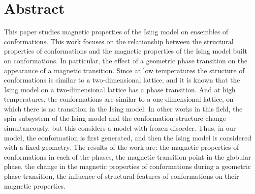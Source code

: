 \section*{Abstract}


This paper studies magnetic properties of the Ising model on ensembles of conformations.
This work focuses on the relationship between the structural properties of conformations and the magnetic properties of the Ising model built on conformations. In particular, the effect of a geometric phase transition on the appearance of a magnetic transition. Since at low temperatures the structure of conformations is similar to a two-dimensional lattice, and it is known that the Ising model on a two-dimensional lattice has a phase transition. And at high temperatures, the conformations are similar to a one-dimensional lattice, on which there is no transition in the Ising model.
In other works in this field, the spin subsystem of the Ising model and the conformation structure change simultaneously, but this considers a model with frozen disorder. Thus, in our model, the conformation is first generated, and then the Ising model is considered with a fixed geometry.
The results of the work are: the magnetic properties of conformations in each of the phases, the magnetic transition point in the globular phase, the change in the magnetic properties of conformations during a geometric phase transition, the influence of structural features of conformations on their magnetic properties.